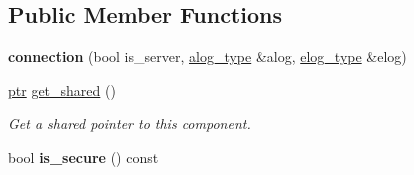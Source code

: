 \subsection*{Public Member Functions}
\begin{DoxyCompactItemize}
\item 
{\bfseries connection} (bool is\+\_\+server, \hyperlink{classwebsocketpp_1_1transport_1_1asio_1_1connection_a457470621386c06374aa3bd189a4715e}{alog\+\_\+type} \&alog, \hyperlink{classwebsocketpp_1_1transport_1_1asio_1_1connection_a1d2ac8c55817ecadf12be51f49578ca5}{elog\+\_\+type} \&elog)\hypertarget{classwebsocketpp_1_1transport_1_1asio_1_1connection_aff25718cc376e7d473d4e46c12e22551}{}\label{classwebsocketpp_1_1transport_1_1asio_1_1connection_aff25718cc376e7d473d4e46c12e22551}

\item 
\hyperlink{classwebsocketpp_1_1transport_1_1asio_1_1connection_aa6f25556860a154c4dacb4dac1dce8e4}{ptr} \hyperlink{classwebsocketpp_1_1transport_1_1asio_1_1connection_ac190efbc8cfd2654bc07b5b9382c36cc}{get\+\_\+shared} ()\hypertarget{classwebsocketpp_1_1transport_1_1asio_1_1connection_ac190efbc8cfd2654bc07b5b9382c36cc}{}\label{classwebsocketpp_1_1transport_1_1asio_1_1connection_ac190efbc8cfd2654bc07b5b9382c36cc}

\begin{DoxyCompactList}\small\item\em Get a shared pointer to this component. \end{DoxyCompactList}\item 
bool {\bfseries is\+\_\+secure} () const\hypertarget{classwebsocketpp_1_1transport_1_1asio_1_1connection_aaca175de7022aa0840bad7429c8988fd}{}\label{classwebsocketpp_1_1transport_1_1asio_1_1connection_aaca175de7022aa0840bad7429c8988fd}


\end{DoxyCompactItemize}
